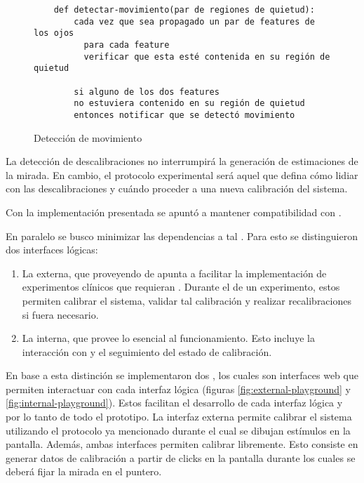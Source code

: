   \begin{figure}
    \begin{verbatim}
    def detectar-movimiento(par de regiones de quietud):
        cada vez que sea propagado un par de features de los ojos
          para cada feature
          verificar que esta esté contenida en su región de quietud

        si alguno de los dos features
        no estuviera contenido en su región de quietud
        entonces notificar que se detectó movimiento\end{verbatim}
    \caption{Detección de movimiento}
    \label{fig:movement-detection}
  \end{figure}

  La detección de descalibraciones no interrumpirá la generación de
  estimaciones de la mirada.
  En cambio, el protocolo experimental será aquel que defina cómo lidiar con
  las descalibraciones y cuándo proceder a una nueva calibración del sistema.
  
  Con la implementación presentada se apuntó a mantener compatibilidad con
  \jspsych.

  En paralelo se busco minimizar las dependencias a tal \framework.
  Para esto se distinguieron dos interfaces lógicas:
  \begin{enumerate}
    \item
      La externa, que proveyendo \timelines de \jspsych apunta a facilitar la
      implementación de experimentos clínicos que requieran \eyetracking.
      Durante el \runtime de un experimento, estos permiten calibrar el
      sistema, validar tal calibración y realizar recalibraciones si fuera
      necesario.
    \item
      La interna, que provee lo esencial al funcionamiento.
      Esto incluye la interacción con \webgazer y el seguimiento del estado de
      calibración.
  \end{enumerate}
  En base a esta distinción se implementaron dos \playgrounds, los cuales son
  interfaces web que permiten interactuar con cada interfaz lógica (figuras
  \ref{fig:external-playground} y \ref{fig:internal-playground}).
  Estos facilitan el desarrollo de cada interfaz lógica y por lo tanto de todo
  el prototipo.
  La interfaz externa permite calibrar el sistema utilizando el protocolo ya
  mencionado durante el cual se dibujan estímulos en la pantalla.
  Además, ambas interfaces permiten calibrar libremente.
  Esto consiste en generar datos de calibración a partir de clicks en la
  pantalla durante los cuales se deberá fijar la mirada en el puntero.

